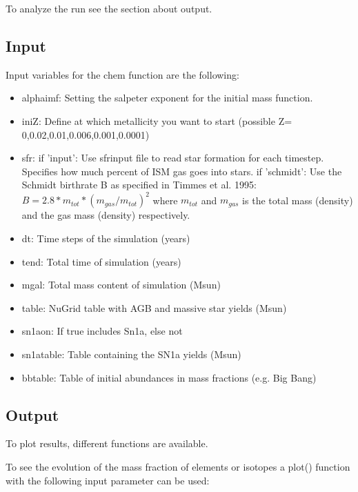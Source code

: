 {To analyze the run see the section about output.


\subsection{Input}

Input variables for the chem function are the following:

\begin{itemize}


  \item alphaimf: Setting the salpeter exponent for the initial mass function.
  \item iniZ: Define at which metallicity you want to start (possible Z= 0,0.02,0.01,0.006,0.001,0.0001)
  \item sfr: if 'input': Use sfr\textunderscore input file to read star formation for each timestep.
                         Specifies how much percent of ISM gas goes into stars. 
             if 'schmidt': Use the Schmidt birthrate B as specified in Timmes et al. 1995:
					$B = 2.8*m_{tot}* (m_{gas}/m_{tot})^2$ 
					where $m_{tot}$ and $m_{gas}$ is the total mass (density) 
					and the gas mass (density) respectively.

  \item dt: Time steps of the simulation (years)
	\item tend: Total time of simulation (years)
	\item mgal: Total mass content of simulation (Msun)
		
  \item table: NuGrid table with AGB and massive star yields (Msun)
  \item sn1a\textunderscore on: If true includes Sn1a, else not
  \item sn1a\textunderscore table: Table containing the SN1a yields (Msun)
  \item bb\textunderscore table: Table of initial abundances in mass fractions
		(e.g. Big Bang)
\end{itemize}


\subsection{Output}


To plot results, different functions are available.

To see the evolution of the mass fraction of elements or isotopes 
a plot() function with the following input parameter can be used:


}
